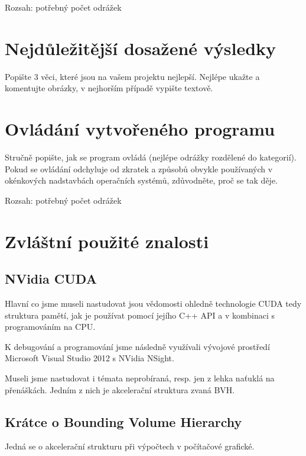\documentclass[11pt,a4paper]{article}
\begin{document}
Rozsah: potřebný počet odrážek

\section{Nejdůležitější dosažené výsledky}

Popište 3 věci, které jsou na vašem projektu nejlepší. Nejlépe ukažte a
komentujte obrázky, v nejhorším případě vypište textově.

\section{Ovládání vytvořeného programu}

Stručně popište, jak se program ovládá (nejlépe odrážky rozdělené do
kategorií). Pokud se ovládání odchyluje od zkratek a způsobů obvykle
používaných v okénkových nadstavbách operačních systémů, zdůvodněte, proč se
tak děje.

Rozsah: potřebný počet odrážek

\section{Zvláštní použité znalosti}


\subsection{NVidia CUDA}
Hlavní co jsme museli nastudovat jsou vědomosti ohledně technologie CUDA tedy struktura pamětí, jak je používat pomocí jejího C++ API a v kombinaci s programováním na CPU.

K debugování a programování jsme následně využívali vývojové prostředí Microsoft Visual Studio 2012 s NVidia NSight.

Museli jsme nastudovat i témata neprobíraná, resp. jen z lehka naťuklá na přenáškách. Jedním z nich je akcelerační struktura zvaná BVH.

\subsection{Krátce o Bounding Volume Hierarchy}
Jedná se o akcelerační strukturu při výpočtech v počítačové grafické.
\end{document}
